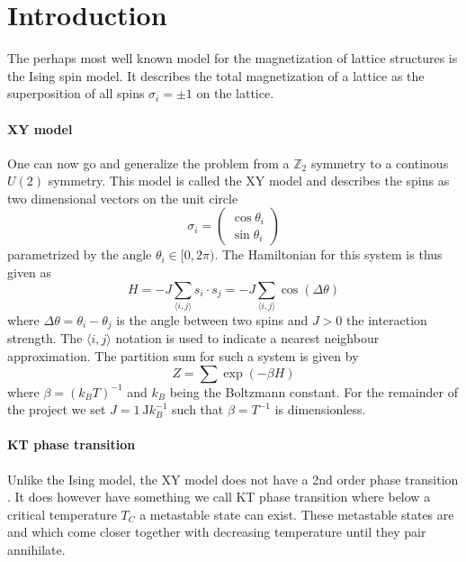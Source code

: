 \section{Introduction}
The perhaps most well known model for the magnetization of lattice structures is the Ising spin model. It describes the total magnetization of a lattice as the superposition of all spins $\sigma_i = \pm 1$ on the lattice.

\paragraph{XY model}
One can now go and generalize the problem from a $\mathbb{Z}_2$ symmetry to a continous $U(2)$ symmetry. This model is called the XY model and describes the spins as two dimensional vectors on the unit circle
\begin{equation}\label{eq:hamiltonian}
	\sigma_i = \begin{pmatrix}
		\cos{\theta_i} \\ \sin{\theta_i}
	\end{pmatrix}
\end{equation}
parametrized by the angle $\theta_i \in [0,2\pi)$. The Hamiltonian for this system is thus given as
\begin{equation}\label{eq:partition}
	H = -J \sum_{\langle i,j \rangle}{s_i \cdot s_j} = -J \sum_{\langle i,j \rangle}{\cos{(\Delta \theta)}}
\end{equation}
\citet[p. 1190, eq. (42)]{kt} where $\Delta \theta = \theta_i - \theta_j$ is the angle between two spins and $J > 0$ the interaction strength. The $\langle i,j \rangle$ notation is used to indicate a nearest neighbour approximation. The partition sum for such a system is given by
\begin{equation}
	Z = \sum{\exp{(-\beta H)}}
\end{equation}
where $\beta = (k_B T)^{-1}$ and $k_B$ being the Boltzmann constant.  For the remainder of the project we set $J = \SI{1}{\joule} k_B^{-1}$ such that $\beta = T^{-1}$ is dimensionless.

\paragraph{KT phase transition}
Unlike the Ising model, the XY model does not have a 2nd order phase transition . It does however have something we call KT phase transition where below a critical temperature $T_C$ a metastable state can exist. These metastable states are  and which come closer together with decreasing temperature until they pair annihilate.
